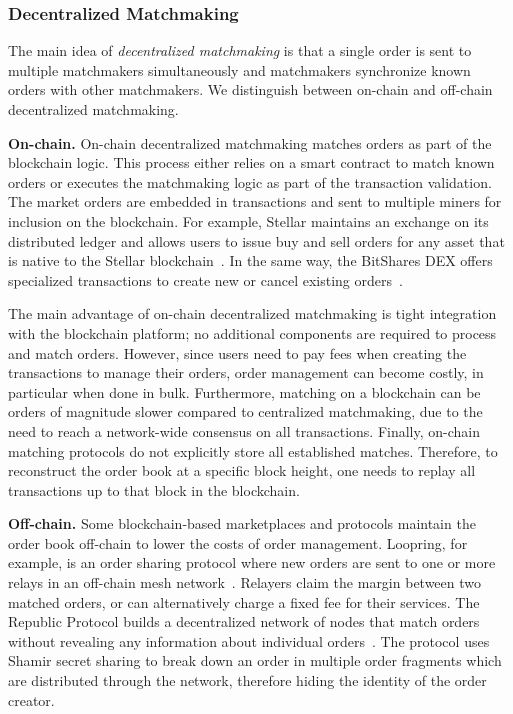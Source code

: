 \subsubsection{Decentralized Matchmaking}
The main idea of \emph{decentralized matchmaking} is that a single order is sent to multiple matchmakers simultaneously and matchmakers synchronize known orders with other matchmakers.
We distinguish between on-chain and off-chain decentralized matchmaking.

\textbf{On-chain.}
On-chain decentralized matchmaking matches orders as part of the blockchain logic.
This process either relies on a smart contract to match known orders or executes the matchmaking logic as part of the transaction validation.
The market orders are embedded in transactions and sent to multiple miners for inclusion on the blockchain.
For example, Stellar maintains an exchange on its distributed ledger and allows users to issue buy and sell orders for any asset that is native to the Stellar blockchain~\cite{lokhava2019fast}.
In the same way, the BitShares DEX offers specialized transactions to create new or cancel existing orders~\cite{schuh2015bitshares}.

The main advantage of on-chain decentralized matchmaking is tight integration with the blockchain platform; no additional components are required to process and match orders.
However, since users need to pay fees when creating the transactions to manage their orders, order management can become costly, in particular when done in bulk.
Furthermore, matching on a blockchain can be orders of magnitude slower compared to centralized matchmaking, due to the need to reach a network-wide consensus on all transactions.
Finally, on-chain matching protocols do not explicitly store all established matches.
Therefore, to reconstruct the order book at a specific block height, one needs to replay all transactions up to that block in the blockchain.

\textbf{Off-chain.}
Some blockchain-based marketplaces and protocols maintain the order book off-chain to lower the costs of order management.
Loopring, for example, is an order sharing protocol where new orders are sent to one or more relays in an off-chain mesh network~\cite{loopring}.
Relayers claim the margin between two matched orders, or can alternatively charge a fixed fee for their services.
The Republic Protocol builds a decentralized network of nodes that match orders without revealing any information about individual orders~\cite{zhang2017republic}.
The protocol uses Shamir secret sharing to break down an order in multiple order fragments which are distributed through the network, therefore hiding the identity of the order creator.

